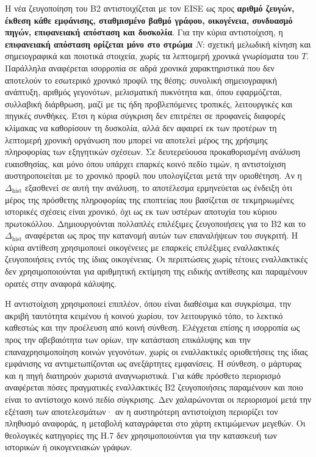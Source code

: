 \documentclass[11pt,a4paper]{article}
\begin{document}
Η νέα ζευγοποίηση του B2 αντιστοιχίζεται με τον EISE ως προς \textbf{αριθμό ζευγών, έκθεση κάθε εμφάνισης, σταθμισμένο βαθμό γράφου, οικογένεια, συνδυασμό πηγών, επιφανειακή απόσταση και δυσκολία}. Για την κύρια αντιστοίχιση, η \textbf{επιφανειακή απόσταση ορίζεται μόνο στο στρώμα $N$}: σχετική μελωδική κίνηση και σημειογραφικά και ποιοτικά στοιχεία, χωρίς τα λεπτομερή χρονικά γνωρίσματα του $T$. Παράλληλα αναφέρεται ισορροπία σε αδρά χρονικά χαρακτηριστικά που δεν αποτελούν το εσωτερικό χρονικό προφίλ της θέσης: συνολική σημειογραφική ανάπτυξη, αριθμός γεγονότων, μελισματική πυκνότητα και, όπου εφαρμόζεται, συλλαβική διάρθρωση, μαζί με τις ήδη προβλεπόμενες τροπικές, λειτουργικές και πηγικές συνθήκες. Έτσι η κύρια σύγκριση δεν επιτρέπει σε προφανείς διαφορές κλίμακας να καθορίσουν τη δυσκολία, αλλά δεν αφαιρεί εκ των προτέρων τη λεπτομερή χρονική οργάνωση που μπορεί να αποτελεί μέρος της χρήσιμης πληροφορίας των εξηγητικών σχέσεων. Σε δευτερεύουσα προκαθορισμένη ανάλυση ευαισθησίας, και μόνο όπου υπάρχει επαρκές κοινό πεδίο τιμών, η αντιστοίχιση αυστηροποιείται με το χρονικό προφίλ που υπολογίζεται μετά την οριοθέτηση. Αν η $\Delta_{\mathrm{hist}}$ εξασθενεί σε αυτή την ανάλυση, το αποτέλεσμα ερμηνεύεται ως ένδειξη ότι μέρος της πρόσθετης πληροφορίας της εποπτείας που βασίζεται σε τεκμηριωμένες ιστορικές σχέσεις είναι χρονικό, όχι ως εκ των υστέρων αποτυχία του κύριου πρωτοκόλλου. Δημιουργούνται πολλαπλές επιλέξιμες ζευγοποιήσεις για το B2 και το $\Delta_{\mathrm{hist}}$ αναφέρεται ως προς την κατανομή αυτών των επαναλήψεων του συγκριτή. Η κύρια αντίθεση χρησιμοποιεί οικογένειες με επαρκείς επιλέξιμες εναλλακτικές ζευγοποιήσεις εντός της ίδιας οικογένειας. Οι περιπτώσεις χωρίς τέτοιες εναλλακτικές δεν χρησιμοποιούνται για αριθμητική εκτίμηση της ειδικής αντίθεσης και παραμένουν ορατές στην αναφορά κάλυψης.

Η αντιστοίχιση χρησιμοποιεί επιπλέον, όπου είναι διαθέσιμα και συγκρίσιμα, την ακριβή ταυτότητα κειμένου ή κοινού χωρίου, τον λειτουργικό τόπο, το λεκτικό καθεστώς και την προέλευση από κοινή σύνθεση. Ελέγχεται επίσης η ισορροπία ως προς την αβεβαιότητα των ορίων, την κατάσταση επικάλυψης και την επαναχρησιμοποίηση κοινών γεγονότων, χωρίς οι εναλλακτικές οριοθετήσεις της ίδιας εμφάνισης να αντιμετωπίζονται ως ανεξάρτητες εμφανίσεις. Η σύνθεση, ο μάρτυρας και η πηγή διατηρούν χωριστά αναγνωριστικά. Για κάθε πρόσθετο περιορισμό αναφέρεται πόσες πραγματικές εναλλακτικές B2 ζευγοποιήσεις παραμένουν και ποιο είναι το αντίστοιχο κοινό πεδίο σύγκρισης. Δεν χαλαρώνονται οι περιορισμοί μετά την εξέταση των αποτελεσμάτων· αν η αυστηρότερη αντιστοίχιση περιορίζει τον πληθυσμό αναφοράς, η μεταβολή καταγράφεται στο χάρτη εκτιμώμενων μεγεθών. Οι θεολογικές κατηγορίες της H.7 δεν χρησιμοποιούνται για την κατασκευή των ιστορικών ή οικογενειακών γράφων.
\end{document}
